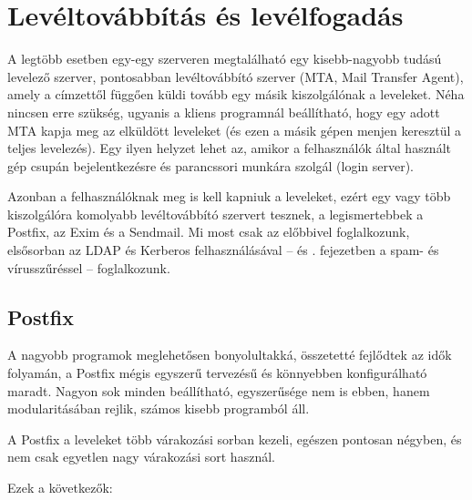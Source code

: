 \chapter{Levéltovábbítás és levélfogadás}\label{chap:Postfix}

A legtöbb esetben egy-egy szerveren megtalálható egy kisebb-nagyobb tudású levelező szerver, pontosabban levéltovábbító
szerver (MTA, Mail Transfer Agent), amely a címzettől függően küldi tovább egy másik kiszolgálónak a leveleket. Néha
nincsen erre szükség, ugyanis a kliens programnál beállítható, hogy egy adott MTA kapja meg az elküldött leveleket (és
ezen a másik gépen menjen keresztül a teljes levelezés). Egy ilyen helyzet lehet az, amikor a felhasználók által
használt gép csupán bejelentkezésre és parancssori munkára szolgál (login server).

Azonban a felhasználóknak meg is kell kapniuk a leveleket, ezért egy vagy több kiszolgálóra komolyabb levéltovábbító
szervert tesznek, a legismertebbek a Postfix, az Exim és a Sendmail. Mi most csak az előbbivel foglalkozunk, elsősorban az
LDAP és Kerberos felhasználásával -- és . fejezetben a spam- és vírusszűréssel -- foglalkozunk.

\section{Postfix}
A nagyobb programok meglehetősen bonyolultakká, összetetté fejlődtek az idők folyamán, a Postfix mégis egyszerű
tervezésű és könnyebben konfigurálható maradt. Nagyon sok minden beállítható, egyszerűsége nem is ebben, hanem
modularitásában rejlik, számos kisebb programból áll.

A Postfix a leveleket több várakozási sorban kezeli, egészen pontosan négyben, és nem csak egyetlen nagy várakozási sort
használ.

Ezek a következők:

